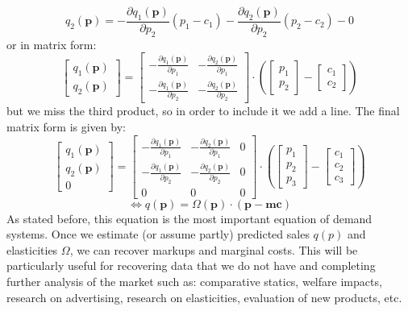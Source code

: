 \documentclass[12pt]{report}
\begin{document}
$$q_2(\mathbf{p}) = -\frac{\partial q_1(\mathbf{p})}{\partial p_2} (p_1 - c_1) - \frac{\partial q_2(\mathbf{p})}{\partial p_2} (p_2 - c_2) - 0 $$ or in matrix form: $$\begin{bmatrix}
q_1(\mathbf{p}) \\
q_2(\mathbf{p})
\end{bmatrix} = 
\begin{bmatrix}
-\frac{\partial q_1(\mathbf{p})}{\partial p_1} &  - \frac{\partial q_2(\mathbf{p})}{\partial p_1} \\
-\frac{\partial q_1(\mathbf{p})}{\partial p_2} &  - \frac{\partial q_2(\mathbf{p})}{\partial p_2}
\end{bmatrix} \cdot \left(
\begin{bmatrix}
p_1 \\ p_2
\end{bmatrix} - 
\begin{bmatrix}
c_1 \\ c_2
\end{bmatrix} \right) $$ but we miss the third product, so in order to include it we add a line. The final matrix form is given by: $$\begin{bmatrix}
q_1(\mathbf{p}) \\
q_2(\mathbf{p}) \\ 0 
\end{bmatrix} = 
\begin{bmatrix}
-\frac{\partial q_1(\mathbf{p})}{\partial p_1} &  - \frac{\partial q_2(\mathbf{p})}{\partial p_1} & 0 \\
-\frac{\partial q_1(\mathbf{p})}{\partial p_2} &  - \frac{\partial q_2(\mathbf{p})}{\partial p_2} & 0 \\
0 & 0 & 0
\end{bmatrix} \cdot \left(
\begin{bmatrix}
p_1 \\ p_2 \\ p_3
\end{bmatrix} - 
\begin{bmatrix}
c_1 \\ c_2 \\ c_3
\end{bmatrix} \right) $$ $$\Leftrightarrow q(\mathbf{p}) = \Omega(\mathbf{p})\cdot(\mathbf{p} - \mathbf{mc}) $$
As stated before, this equation is the most important equation of demand systems. Once we estimate (or assume partly) predicted sales $q(p)$ and elasticities $\Omega$, we can recover markups and marginal costs. This will be particularly useful for recovering data that we do not have and completing further analysis of the market such as: comparative statics, welfare impacts, research on advertising, research on elasticities, evaluation of new products, etc.
\end{document}
